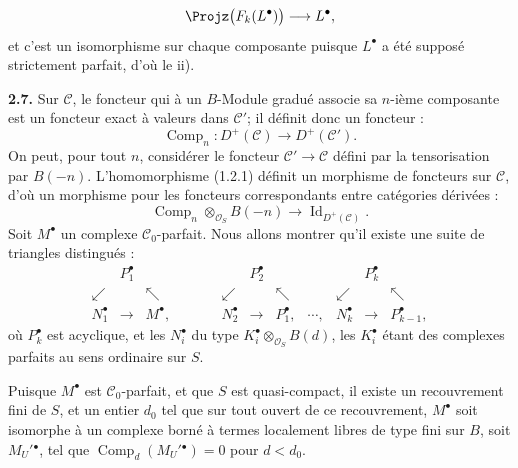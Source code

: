 \[
  \Projz\bigl(F_k(L^{\bullet})\bigr)\longrightarrow L^{\bullet},
\]
et c'est un
isomorphisme sur chaque composante puisque $L^{\bullet}$ a été supposé strictement parfait, d'où le ii).

\textbf{2.7.} Sur $\mathcal C$, le foncteur qui à un $B$-Module gradué associe sa $n$-ième composante est un foncteur exact à valeurs dans $\mathcal C'$; il définit donc un foncteur :
\begin{equation}\tag{2.7.1}
  \operatorname{Comp}_n:D^+(\mathcal C)\longrightarrow D^+(\mathcal C').
\end{equation}
On peut, pour tout $n$, considérer le foncteur $\mathcal C'\to\mathcal C$ défini par la tensorisation par $B(-n)$. L'homomorphisme (1.2.1) définit un morphisme de foncteurs sur $\mathcal C$, d'où un morphisme pour les foncteurs correspondants entre catégories dérivées :
\begin{equation}\tag{2.7.2}
  \operatorname{Comp}_n\otimes_{\mathcal O_S} B(-n)
  \longrightarrow \operatorname{Id}_{D^+(\mathcal C)}.
\end{equation}
Soit $M^{\bullet}$ un complexe $\mathcal C_0$-parfait. Nous allons montrer qu'il existe une suite de triangles distingués :
\[
\begin{array}{ccccccccccc}
& P_1^{\bullet} &&&& P_2^{\bullet} &&&& P_k^{\bullet} & \\
\swarrow && \nwarrow && \swarrow && \nwarrow && \swarrow && \nwarrow \\
N_1^{\bullet} & \longrightarrow & M^{\bullet}, & \qquad &
N_2^{\bullet} & \longrightarrow & P_1^{\bullet}, & \cdots, &
N_k^{\bullet} & \longrightarrow & P_{k-1}^{\bullet},
\end{array}
\]
où $P_k^{\bullet}$ est acyclique, et les $N_i^{\bullet}$ du type \(K_i^{\bullet}\otimes_{\mathcal O_S}B(d)\), les $K_i^{\bullet}$ étant des complexes parfaits au sens ordinaire sur $S$.

Puisque $M^{\bullet}$ est $\mathcal C_0$-parfait, et que $S$ est quasi-compact, il existe un recouvrement fini de $S$, et un entier $d_0$ tel que sur tout ouvert de ce recouvrement, $M^{\bullet}$ soit isomorphe à un complexe borné à termes localement libres de type fini sur $B$, soit $M_U'{}^{\bullet}$, tel que $\operatorname{Comp}_d(M_U'{}^{\bullet})=0$ pour $d<d_0$.

